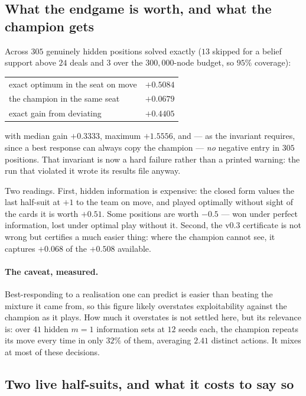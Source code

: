 \documentclass[11pt,a4paper]{article}
\begin{document}
\subsection{What the endgame is worth, and what the champion gets}

Across $305$ genuinely hidden positions solved exactly ($13$ skipped for a
belief support above $24$ deals and $3$ over the $300{,}000$-node budget, so
$95\%$ coverage):

\begin{center}
\begin{tabular}{lr}
\toprule
exact optimum in the seat on move & $+0.5084$ \\
the champion in the same seat & $+0.0679$ \\
\midrule
exact gain from deviating & $\mathbf{+0.4405}$ \\
\bottomrule
\end{tabular}
\end{center}

with median gain $+0.3333$, maximum $+1.5556$, and --- as the invariant
requires, since a best response can always copy the champion --- \emph{no}
negative entry in $305$ positions. That invariant is now a hard
failure rather than a printed warning: the run that violated it wrote its
results file anyway.

Two readings. First, hidden information is expensive: the closed form values
the last half-suit at $+1$ to the team on move, and played optimally without
sight of the cards it is worth $+0.51$. Some positions are worth $-0.5$ ---
won under perfect information, lost under optimal play without it. Second, the
v0.3 certificate is not wrong but certifies a much easier thing: where the
champion cannot see, it captures $+0.068$ of the $+0.508$ available.

\paragraph{The caveat, measured.} Best-responding to a realisation one can
predict is easier than beating the mixture it came from, so this figure likely
overstates exploitability against the champion as it plays. How much it
overstates is not settled here, but its relevance is: over $41$ hidden $m = 1$
information sets at $12$ seeds each, the champion repeats its move every time
in only $32\%$ of them, averaging $2.41$ distinct actions. It mixes at most of
these decisions.

\subsection{Two live half-suits, and what it costs to say so}
\label{sec:iim2}
\end{document}
